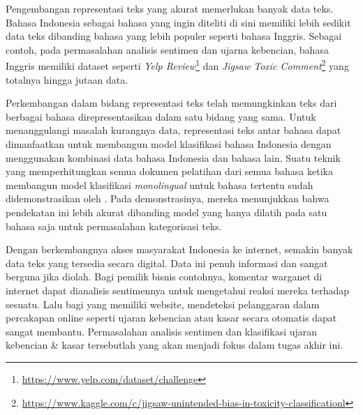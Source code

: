 Pengembangan representasi teks yang akurat memerlukan banyak data teks. Bahasa Indonesia sebagai bahasa yang ingin diteliti di sini memiliki lebih sedikit data teks dibanding bahasa yang lebih populer seperti bahasa Inggris. Sebagai contoh, pada permasalahan analisis sentimen dan ujarna kebencian, bahasa Inggris memiliki dataset seperti \textit{Yelp Review}\footnote{\url{https://www.yelp.com/dataset/challenge}} dan \textit{Jigsaw Toxic Comment}\footnote{\url{https://www.kaggle.com/c/jigsaw-unintended-bias-in-toxicity-classificationl}} yang totalnya hingga jutaan data. 

Perkembangan dalam bidang representasi teks telah memungkinkan teks dari berbagai bahasa direpresentasikan dalam satu bidang yang sama. Untuk menanggulangi masalah kurangnya data, representasi teks antar bahasa dapat dimanfaatkan untuk membangun model klasifikasi bahasa Indonesia dengan menggunakan kombinasi data bahasa Indonesia dan bahasa lain. Suatu teknik yang memperhitungkan semua dokumen pelatihan dari semua bahasa ketika membangun model klasifikasi \textit{monolingual} untuk bahasa tertentu sudah didemonstrasikan oleh \parencite{Wei_Shi_Yang_2007}. Pada demonstrasinya, mereka menunjukkan bahwa pendekatan ini lebih akurat dibanding model yang hanya dilatih pada satu bahasa saja untuk permasalahan kategorisasi teks. 


Dengan berkembangnya akses masyarakat Indonesia ke internet, semakin banyak data teks yang tersedia secara digital. Data ini penuh informasi dan sangat berguna jika diolah. Bagi pemilik bisnis contohnya, komentar warganet di internet dapat dianalisis sentimennya untuk mengetahui reaksi mereka terhadap sesuatu. Lalu bagi yang memiliki website, mendeteksi pelanggaran dalam percakapan online seperti ujaran kebencian atau kasar secara otomatis dapat sangat membantu. Permasalahan analisis sentimen dan klasifikasi ujaran kebencian \& kasar tersebutlah yang akan menjadi fokus dalam tugas akhir ini.

